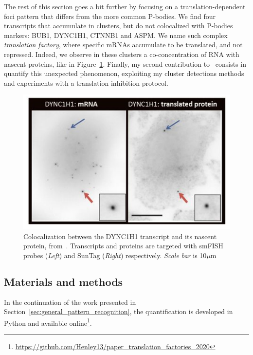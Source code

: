 The rest of this section goes a bit further by focusing on a translation-dependent foci pattern that differs from the more common \ac{P-bodies}.
We find four transcripts that accumulate in clusters, but do not colocalized with \ac{P-bodies} markers: BUB1, DYNC1H1, CTNNB1 and ASPM.
We name such complex \emph{translation factory}, where specific \ac{mRNA}s accumulate to be translated, and not repressed.
Indeed, we observe in these clusters a co-concentration of \ac{RNA} with nascent proteins, like in Figure~\ref{fig:translation_factory}.
Finally, my second contribution to~\cite{CHOUAIB_2020} consists in quantify this unexpected phenomenon, exploiting my cluster detections methods and experiments with a translation inhibition protocol.

\begin{figure}[]
    \centering
    \includegraphics[width=\textwidth]{figures/chapter5/translation_factory}
    \caption{Colocalization between the DYNC1H1 transcript and its nascent protein, from~\cite{pichon_visualization_2016}.
	Transcripts and proteins are targeted with smFISH probes (\textit{Left}) and SunTag (\textit{Right}) respectively.
	\textit{Scale bar} is 10$\mu$m}
    \label{fig:translation_factory}
\end{figure}

\subsection{Materials and methods}
\label{subsec:materials_translation_factories}

In the continuation of the work presented in Section~\ref{sec:general_pattern_recognition}, the quantification is developed in Python and available online\footnote{\url{https://github.com/Henley13/paper_translation_factories_2020}}.

